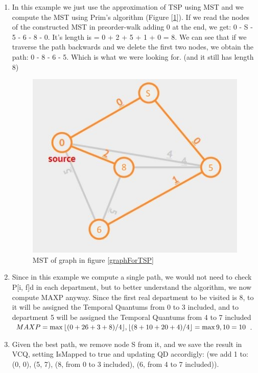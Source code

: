 \documentclass[a4paper, 12pt, oneside, table]{article}
\DeclarePairedDelimiter{\floor}{\lfloor}{\rfloor}
\begin{document}
\begin{enumerate}
    \item In this example we just use the approximation of TSP using MST and we compute the MST using Prim's algorithm (Figure [\ref{mst}]).\newline
    If we read the nodes of the constructed MST in preorder-walk adding 0 at the end, we get: 0 - S - 5 - 6 - 8 - 0. It's length is = 0 + 2 + 5 + 1 + 0 = 8. We can see that if we traverse the path backwards and we delete the first two nodes, we obtain the path: 0 - 8 - 6 - 5. Which is what we were looking for. (and it still has length 8)
    \begin{figure}[H]
    \centering
        \centering
        \includegraphics[height=0.4\textheight, scale=0.2, keepaspectratio]{img/alg_map_man/mst2.JPG}
        \caption{MST of graph in figure \ref{graphForTSP}}
        \label{mst}
    \end{figure}
    \item Since in this example we compute a single path, we would not need to check P[i, f]d in each department, but to better understand the algorithm, we now compute MAXP anyway. Since the first real department to be visited is 8, to it will be assigned the Temporal Quantums from 0 to 3 included, and to department 5 will be assigned the Temporal Quantums from 4 to 7 included \newline
    $MAXP = \max{\floor{(0 + 26 + 3 + 8)/4}, \floor{(8 + 10 + 20 + 4)/4}} = \max{9, 10} = 10$.
    \item Given the best path, we remove node S from it, and we save the result in VCQ, setting IsMapped to true and updating QD accordigly: (we add 1 to: (0, 0), (5, 7), (8, from 0 to 3 included), (6, from 4 to 7 included)).

\end{enumerate}
\end{document}
